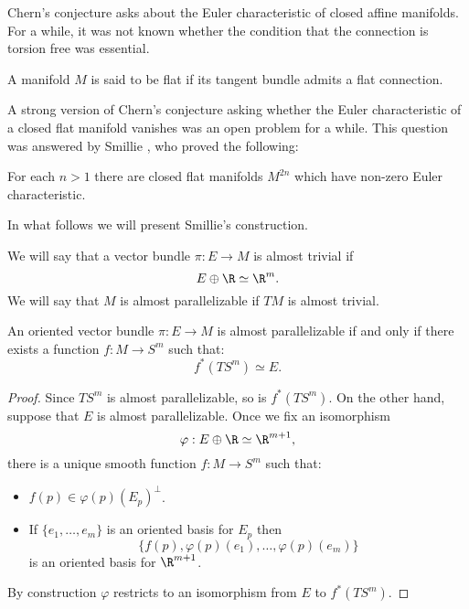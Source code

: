 Chern's conjecture asks about the Euler characteristic of closed affine manifolds. For a while, it was not known whether the condition that the connection is torsion free was essential.
\begin{definition}
	A manifold $M$ is said to be flat if its tangent bundle admits a flat connection.
\end{definition}

A strong version of Chern's conjecture asking whether the Euler characteristic of a closed flat manifold vanishes was an open problem for a while. This question was answered by Smillie \cite{Smillie}, who proved the following:


\begin{theoremnn}[Smillie]
	For each $n>1$ there are closed flat manifolds $M^{2n}$ which have non-zero Euler characteristic.
\end{theoremnn}

In what follows we will present Smillie's construction.
\begin{definition}
	We will say that a vector bundle $\pi:E \rightarrow M$ is almost trivial if \[E \oplus \R\simeq \R^m.\]
	We will say that $M$ is almost parallelizable if $TM$ is almost trivial.
\end{definition}











\begin{lemma}\label{pull}
	An oriented vector bundle $\pi: E \rightarrow M$ is almost parallelizable if and only if there exists a function $f: M \rightarrow S^m$ such that:
	\[ f^*(TS^m)\simeq E.\]
\end{lemma}

\begin{proof} Since $TS^m$ is almost parallelizable, so is $f^*(TS^m)$.
	On the other hand, suppose that $E$ is almost parallelizable. Once we fix an isomorphism
	\[ \varphi: E \oplus \R \simeq \R^{m+1},\]
	there is a unique smooth function $f: M \rightarrow S^m$ such that:
	\begin{itemize}
		\item $f(p) \in \varphi(p)(E_p)^\bot$.
		\item If $\{e_1, \dots , e_m\}$ is an oriented basis for $E_p$ then \[\{ f(p), \varphi(p)(e_1),\dots, \varphi(p)(e_m)\}\] is
		an oriented basis for $\R^{m+1}$.
	\end{itemize}
	By construction $\varphi$ restricts to an isomorphism from $E$ to $f^*(TS^m)$.
\end{proof}

